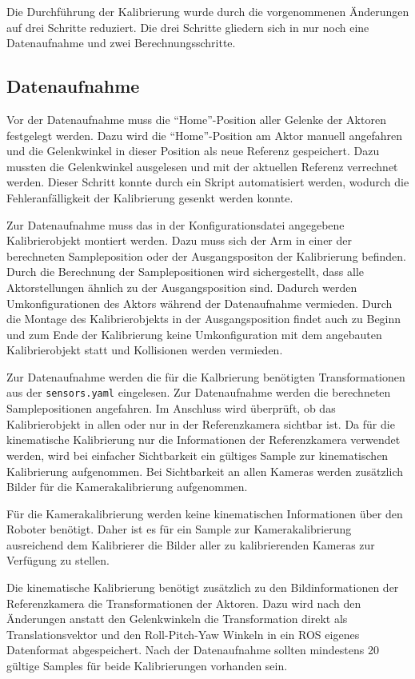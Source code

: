 Die Durchführung der Kalibrierung wurde durch die vorgenommenen Änderungen auf
drei Schritte reduziert. Die drei Schritte gliedern sich in nur noch eine 
Datenaufnahme und zwei Berechnungsschritte.

\subsection{Datenaufnahme}
\label{sub:Datenaufnahme}

Vor der Datenaufnahme muss die ``Home''-Position aller Gelenke der Aktoren 
festgelegt werden. Dazu wird die ``Home''-Position am Aktor manuell angefahren 
und die Gelenkwinkel in dieser Position als neue Referenz gespeichert. Dazu 
mussten die Gelenkwinkel ausgelesen und mit der aktuellen Referenz verrechnet 
werden. Dieser Schritt konnte durch ein Skript automatisiert werden, wodurch die
Fehleranfälligkeit der Kalibrierung gesenkt werden konnte.

Zur Datenaufnahme muss das in der Konfigurationsdatei angegebene Kalibrierobjekt
montiert werden. Dazu muss sich der Arm in einer der berechneten Sampleposition 
oder der Ausgangspositon der Kalibrierung befinden. Durch die Berechnung der 
Samplepositionen wird sichergestellt, dass alle Aktorstellungen ähnlich zu der
Ausgangsposition sind. Dadurch werden Umkonfigurationen des Aktors während der 
Datenaufnahme vermieden. Durch die Montage des Kalibrierobjekts in der
Ausgangsposition findet auch zu Beginn und zum Ende der Kalibrierung keine 
Umkonfiguration mit dem angebauten Kalibrierobjekt statt und Kollisionen werden
vermieden.

Zur Datenaufnahme werden die für die Kalbrierung benötigten Transformationen
aus der \texttt{sensors.yaml} eingelesen. Zur Datenaufnahme werden die 
berechneten Samplepositionen angefahren. Im Anschluss wird überprüft, ob das
Kalibrierobjekt in allen oder nur in der Referenzkamera sichtbar ist. Da für die
kinematische Kalibrierung nur die Informationen der Referenzkamera verwendet
werden, wird bei einfacher Sichtbarkeit ein gültiges Sample zur kinematischen 
Kalibrierung aufgenommen. Bei Sichtbarkeit an allen Kameras werden zusätzlich 
Bilder für die Kamerakalibrierung aufgenommen.

Für die Kamerakalibrierung werden keine kinematischen Informationen über den
Roboter benötigt. Daher ist es für ein Sample zur Kamerakalibrierung ausreichend
dem Kalibrierer die Bilder aller zu kalibrierenden Kameras zur Verfügung zu
stellen. 

Die kinematische Kalibrierung benötigt zusätzlich zu den Bildinformationen der 
Referenzkamera die Transformationen der Aktoren. Dazu wird nach den Änderungen
anstatt den Gelenkwinkeln die Transformation direkt als Translationsvektor und 
den Roll-Pitch-Yaw Winkeln in ein \ac{ROS} eigenes Datenformat abgespeichert.
Nach der Datenaufnahme sollten mindestens 20 gültige Samples für beide 
Kalibrierungen vorhanden sein. 

